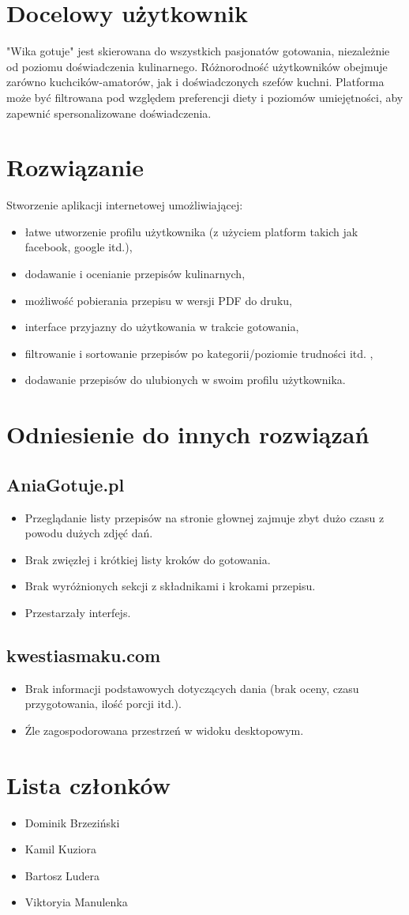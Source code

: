\documentclass{article}
\begin{document}
\section{Docelowy użytkownik}
"Wika gotuje" jest skierowana do wszystkich pasjonatów gotowania, niezależnie od poziomu doświadczenia kulinarnego. Różnorodność użytkowników obejmuje zarówno kuchcików-amatorów, jak i doświadczonych szefów kuchni. Platforma może być filtrowana pod względem preferencji diety i poziomów umiejętności, aby zapewnić spersonalizowane doświadczenia.


\section{Rozwiązanie}
Stworzenie aplikacji internetowej umożliwiającej:
\begin{itemize}
    \item łatwe utworzenie profilu użytkownika (z użyciem platform takich jak facebook, google itd.),
    \item dodawanie i ocenianie przepisów kulinarnych,
    \item możliwość pobierania przepisu w wersji PDF do druku,
    \item interface przyjazny do użytkowania w trakcie gotowania,
    \item filtrowanie i sortowanie przepisów po kategorii/poziomie trudności itd. ,
    \item dodawanie przepisów do ulubionych w swoim profilu użytkownika.
\end{itemize}

\section{Odniesienie do innych rozwiązań}
\subsection{AniaGotuje.pl}
\begin{itemize}
    \item Przeglądanie listy przepisów na stronie głownej zajmuje zbyt dużo czasu z powodu dużych zdjęć dań.
    \item Brak zwięzłej i krótkiej listy kroków do gotowania.
    \item Brak wyróżnionych sekcji z składnikami i krokami przepisu.
    \item Przestarzały interfejs.
\end{itemize}
\subsection{kwestiasmaku.com}
\begin{itemize}
    \item Brak informacji podstawowych dotyczących dania (brak oceny, czasu przygotowania, ilość porcji itd.).
    \item Źle zagospodorowana przestrzeń w widoku desktopowym.
\end{itemize}
\section{Lista członków}
\begin{itemize}
    \item Dominik Brzeziński
    \item Kamil Kuziora
    \item Bartosz Ludera
    \item Viktoryia Manulenka
\end{itemize}
\end{document}
